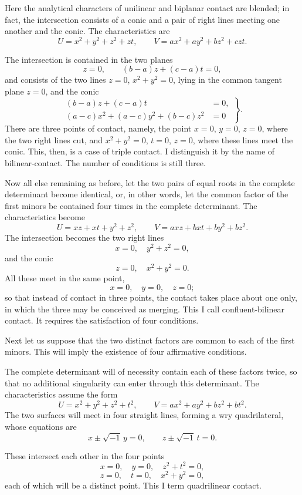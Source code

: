 \documentclass[11pt]{article}
\newcommand{\sourcepage}[1]{\marginpar{\scriptsize p.~#1}}
\begin{document}
{{Here the analytical characters of unilinear and biplanar contact are blended; in fact, the intersection consists of a conic and a pair of right lines meeting one another and the conic. The characteristics are
\[
U=x^2+y^2+z^2+zt,
\qquad
V=ax^2+ay^2+bz^2+czt.
\]

\sourcepage{232}
The intersection is contained in the two planes
\[
z=0,
\qquad
(b-a)z+(c-a)t=0,
\]
and consists of the two lines $z=0$, $x^2+y^2=0$, lying in the common tangent plane $z=0$, and the conic
\[
\left.\begin{aligned}
(b-a)z+(c-a)t&=0,\\
(a-c)x^2+(a-c)y^2+(b-c)z^2&=0
\end{aligned}\right\}.
\]
There are three points of contact, namely, the point $x=0$, $y=0$, $z=0$, where the two right lines cut, and $x^2+y^2=0$, $t=0$, $z=0$, where these lines meet the conic. This, then, is a case of triple contact. I distinguish it by the name of bilinear-contact. The number of conditions is still three.

Now all else remaining as before, let the two pairs of equal roots in the complete determinant become identical, or, in other words, let the common factor of the first minors be contained four times in the complete determinant. The characteristics become
\[
U=xz+xt+y^2+z^2,
\qquad
V=axz+bxt+by^2+bz^2.
\]
The intersection becomes the two right lines
\[
x=0,
\quad y^2+z^2=0,
\]
and the conic
\[
z=0,
\quad x^2+y^2=0.
\]
All these meet in the same point,
\[
x=0,
\quad y=0,
\quad z=0;
\]
so that instead of contact in three points, the contact takes place about one only, in which the three may be conceived as merging. This I call confluent-bilinear contact. It requires the satisfaction of four conditions.

Next let us suppose that the two distinct factors are common to each of the first minors. This will imply the existence of four affirmative conditions.

The complete determinant will of necessity contain each of these factors twice, so that no additional singularity can enter through this determinant. The characteristics assume the form
\[
U=x^2+y^2+z^2+t^2,
\qquad
V=ax^2+ay^2+bz^2+bt^2.
\]
The two surfaces will meet in four straight lines, forming a wry quadrilateral, whose equations are
\[
x\pm\sqrt{-1}\,y=0,
\qquad
z\pm\sqrt{-1}\,t=0.
\]

\sourcepage{233}
These intersect each other in the four points
\[
x=0,
\quad y=0,
\quad z^2+t^2=0,
\]
\[
z=0,
\quad t=0,
\quad x^2+y^2=0,
\]
each of which will be a distinct point. This I term quadrilinear contact.

}}
\end{document}
